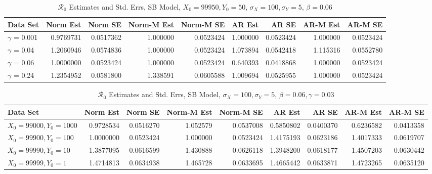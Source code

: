 \documentclass[12pt]{article}
\newcommand{\rr}{\ensuremath{\mathcal{R}_0}}
\begin{document}
\begin{table}[H]
	
	\caption{\label{tab:}$\rr$ Estimates and Std. Errs, SB Model,
		$X_0 = 99950, Y_0 = 50$, $\sigma_X = 100, \sigma_Y = 5$, $\beta = 0.06$}
	\centering
	\begin{footnotesize}
	\begin{tabular}[t]{l|r|r|r|r|r|r|r|r}
		\hline
		Data Set & Norm Est & Norm SE & Norm-M Est & Norm-M SE & AR Est & AR SE & AR-M Est & AR-M SE\\
		\hline
		$\gamma$ = 0.001 & 0.9769731 & 0.0517362 & 1.000000 & 0.0523424 & 1.000000 & 0.0523424 & 1.000000 & 0.0523424\\
		\hline
		$\gamma$ = 0.04 & 1.2060946 & 0.0574836 & 1.000000 & 0.0523424 & 1.073894 & 0.0542418 & 1.115316 & 0.0552780\\
		\hline
		$\gamma$ = 0.06 & 1.0000000 & 0.0523424 & 1.000000 & 0.0523424 & 0.640393 & 0.0418868 & 1.000000 & 0.0523424\\
		\hline
		$\gamma$ = 0.24 & 1.2354952 & 0.0581800 & 1.338591 & 0.0605588 & 1.009694 & 0.0525955 & 1.000000 & 0.0523424\\
		\hline
	\end{tabular}
\end{footnotesize}
\end{table}


\begin{table}[H]
	
	\caption{\label{tab:}$\rr$ Estimates and Std. Errs, SB Model,
		$\sigma_X = 100, \sigma_Y = 5$, $\beta = 0.06, \gamma = 0.03$}
	\centering
	\begin{footnotesize}
		\begin{tabular}[t]{l|r|r|r|r|r|r|r|r}
			\hline
			Data Set & Norm Est & Norm SE & Norm-M Est & Norm-M SE & AR Est & AR SE & AR-M Est & AR-M SE\\
			\hline
			$X_0 = 99000, Y_0 = 1000$ & 0.9728534 & 0.0516270 & 1.052579 & 0.0537008 & 0.5850802 & 0.0400370 & 0.6236582 & 0.0413358\\
			\hline
			$X_0 = 99900, Y_0 = 100$ & 1.0000000 & 0.0523424 & 1.000000 & 0.0523424 & 1.4175193 & 0.0623186 & 1.4017333 & 0.0619707\\
			\hline
			$X_0 = 99990, Y_0 = 10$ & 1.3877095 & 0.0616599 & 1.430888 & 0.0626118 & 1.3948200 & 0.0618177 & 1.4507203 & 0.0630442\\
			\hline
			$X_0 = 99999, Y_0 = 1$ & 1.4714813 & 0.0634938 & 1.465728 & 0.0633695 & 1.4665442 & 0.0633871 & 1.4723265 & 0.0635120\\
			\hline
		\end{tabular}
	\end{footnotesize}
\end{table}
\end{document}

